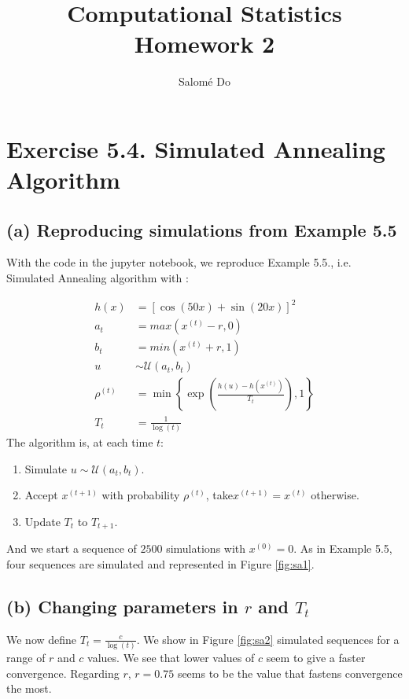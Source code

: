 \documentclass{article}
\begin{document}
    
\thispagestyle{empty}

\title{Computational Statistics\\ Homework 2 }
\author{Salomé Do}
\maketitle

\section*{Exercise 5.4. Simulated Annealing Algorithm}

\subsection*{(a) Reproducing simulations from Example 5.5}


With the code in the jupyter notebook, we reproduce Example 5.5., i.e.
Simulated Annealing algorithm with :

\begin{align*}
    h(x) &= [\cos(50x) + \sin(20x)]^2 \\
    a_t &= max(x^{(t)}-r, 0) \\
    b_t &= min(x^{(t)}+r, 1) \\
    u &\sim \mathcal{U}(a_t, b_t) \\
    \rho^{(t)} &= \min \left \{  \exp\left ( \frac{h(u)-h(x^{(t)})}{T_t}\right ), 1    \right \} \\
    T_t &= \frac{1}{\log(t)}
\end{align*}
The algorithm is, at each time $t$: 
\begin{enumerate}
    \item Simulate $u \sim \mathcal{U}(a_t, b_t)$. 
    \item Accept $x^{(t+1)}$ with probability $\rho^{(t)}$, take$x^{(t+1)} =x^{(t)}$ otherwise.
    \item Update $T_t$ to $T_{t+1}$.
\end{enumerate}

\noindent And we start a sequence of $2500$ simulations with $x^{(0)}= 0$. 
As in Example 5.5, four sequences are simulated and represented in Figure \ref{fig:sa1}.

\subsection*{(b) Changing parameters in $r$ and $T_t$}

We now define $T_t = \frac{c}{\log(t)}$. We show in Figure \ref{fig:sa2} simulated
sequences for a range of $r$ and $c$ values. We see that lower values of $c$
seem to give a faster convergence. Regarding $r$, $r=0.75$ seems to be the value that
fastens convergence the most.
\end{document}

